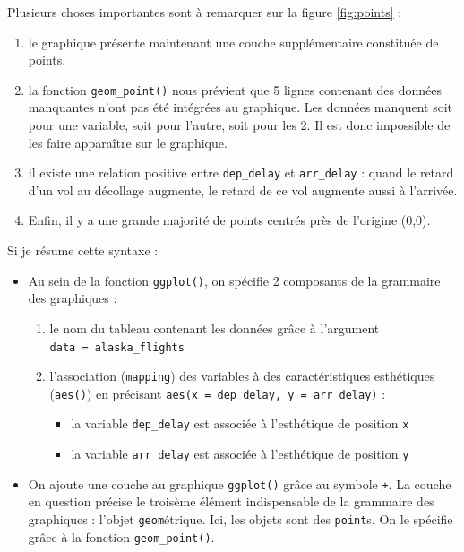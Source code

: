 \documentclass[a4paperpaper,]{article}
\providecommand{\tightlist}{%
  \setlength{\itemsep}{0pt}\setlength{\parskip}{0pt}}
\begin{document}
Plusieurs choses importantes sont à remarquer sur la figure \ref{fig:points} :

\begin{enumerate}
\def\labelenumi{\arabic{enumi}.}
\tightlist
\item
  le graphique présente maintenant une couche supplémentaire constituée de points.
\item
  la fonction \texttt{geom\_point()} nous prévient que 5 lignes contenant des données manquantes n'ont pas été intégrées au graphique. Les données manquent soit pour une variable, soit pour l'autre, soit pour les 2. Il est donc impossible de les faire apparaître sur le graphique.
\item
  il existe une relation positive entre \texttt{dep\_delay} et \texttt{arr\_delay} : quand le retard d'un vol au décollage augmente, le retard de ce vol augmente aussi à l'arrivée.
\item
  Enfin, il y a une grande majorité de points centrés près de l'origine (0,0).
\end{enumerate}

Si je résume cette syntaxe :

\begin{itemize}
\tightlist
\item
  Au sein de la fonction \texttt{ggplot()}, on spécifie 2 composants de la grammaire des graphiques :

  \begin{enumerate}
  \def\labelenumi{\arabic{enumi}.}
  \tightlist
  \item
    le nom du tableau contenant les données grâce à l'argument \texttt{data\ =\ alaska\_flights}
  \item
    l'association (\texttt{mapping}) des variables à des caractéristiques esthétiques (\texttt{aes()}) en précisant \texttt{aes(x\ =\ dep\_delay,\ y\ =\ arr\_delay)} :

    \begin{itemize}
    \tightlist
    \item
      la variable \texttt{dep\_delay} est associée à l'esthétique de position \texttt{x}
    \item
      la variable \texttt{arr\_delay} est associée à l'esthétique de position \texttt{y}
    \end{itemize}
  \end{enumerate}
\item
  On ajoute une couche au graphique \texttt{ggplot()} grâce au symbole \texttt{+}. La couche en question précise le troisème élément indispensable de la grammaire des graphiques : l'objet \texttt{geom}étrique. Ici, les objets sont des \texttt{point}s. On le spécifie grâce à la fonction \texttt{geom\_point()}.
\end{itemize}
\end{document}
